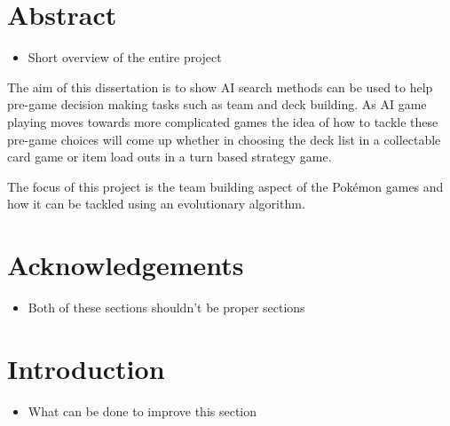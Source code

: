 \documentclass[a4paper]{article}
\newcommand{\Pokemon}{Pok\'{e}mon}
\begin{document}
\section*{Abstract}
\begin{itemize}
    \item Short overview of the entire project
\end{itemize}
The aim of this dissertation is to show AI search methods can be used to help pre-game decision making tasks such as team and deck building.
As AI game playing moves towards more complicated games the idea of how to tackle these pre-game choices will come up whether in choosing the deck list in a collectable card game or item load outs in a turn based strategy game.
\par
The focus of this project is the team building aspect of the \Pokemon{} games and how it can be tackled using an evolutionary algorithm.
\vfill
\section*{Acknowledgements}
\begin{itemize}
    \item Both of these sections shouldn't be proper sections
\end{itemize}
\pagebreak

\tableofcontents
\setcounter{page}{1}
\pagebreak

\section{Introduction}
\begin{itemize}
	\item What can be done to improve this section
\end{itemize}
\end{document}

